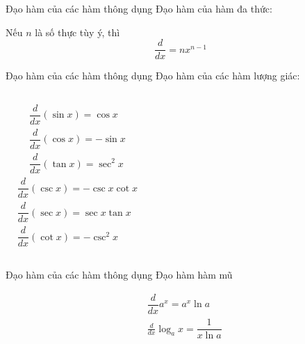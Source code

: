 \begin{frame}{Đạo hàm của các hàm thông dụng}
    Đạo hàm của hàm đa thức:
    \begin{tcolorbox}[colback=blue!10, colframe=blue!50!black, title=Quy tắc lũy thừa]
    Nếu $n$ là số thực tùy ý, thì
    \begin{equation}
        \dfrac{d}{dx}=nx^{n-1}
    \end{equation}
    \end{tcolorbox}
\end{frame}
\begin{frame}{Đạo hàm của các hàm thông dụng}
    Đạo hàm của các hàm lượng giác:
    \begin{tcolorbox}[colback=blue!10, colframe=blue!50!black, title=]
    \begin{columns}
        $$
        \begin{aligned}
            &\dfrac{d}{dx}(\sin x)=\cos x\\
            &\dfrac{d}{dx}(\cos x)=-\sin x\\
            &\dfrac{d}{dx}(\tan x)=\sec^2 x
        \end{aligned}
        $$
    $$
    \begin{aligned}
        &\dfrac{d}{dx}(\csc x)=-\csc x \cot x\\
        &\dfrac{d}{dx}(\sec x)=\sec x \tan x\\
        &\dfrac{d}{dx}(\cot x)=-\csc^2 x
        \end{aligned}
    $$
    \end{columns}
    \end{tcolorbox}
\end{frame}
\begin{frame}{Đạo hàm của các hàm thông dụng}
    Đạo hàm hàm mũ
    \begin{tcolorbox}[colback=blue!10, colframe=blue!50!black, title=]
    \begin{equation}
    \begin{aligned}
        &\dfrac{d}{dx}a^x=a^x \ln a\\
        &\frac{d}{dx}\log_ax=\dfrac{1}{x\ln a}
        \end{aligned}
    \end{equation}
    \end{tcolorbox}
\end{frame}
